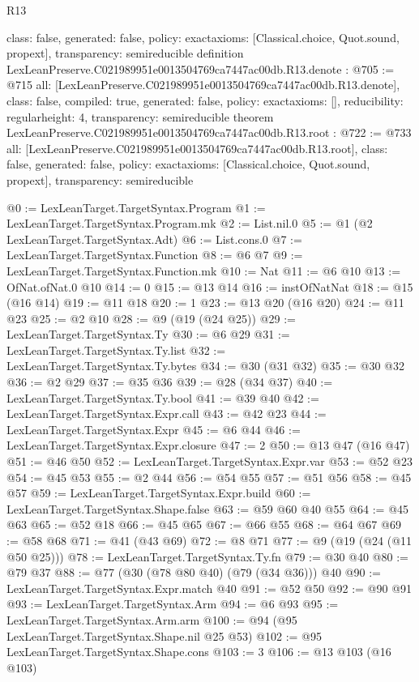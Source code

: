 \begin{lexlean}{R13}
\begin{coremodule}
{  class: false,
  generated: false,
  policy: exact{axioms: [Classical.choice, Quot.sound, propext]},
  transparency: semireducible
}
definition LexLeanPreserve.C021989951e0013504769ca7447ac00db.R13.denote : @705 := @715 {
  all: [LexLeanPreserve.C021989951e0013504769ca7447ac00db.R13.denote],
  class: false,
  compiled: true,
  generated: false,
  policy: exact{axioms: []},
  reducibility: regular{height: 4},
  transparency: semireducible
}
theorem LexLeanPreserve.C021989951e0013504769ca7447ac00db.R13.root : @722 := @733 {
  all: [LexLeanPreserve.C021989951e0013504769ca7447ac00db.R13.root],
  class: false,
  generated: false,
  policy: exact{axioms: [Classical.choice, Quot.sound, propext]},
  transparency: semireducible
}

@0 := LexLeanTarget.TargetSyntax.Program
@1 := LexLeanTarget.TargetSyntax.Program.mk
@2 := List.nil.{0}
@5 := @1 (@2 LexLeanTarget.TargetSyntax.Adt)
@6 := List.cons.{0}
@7 := LexLeanTarget.TargetSyntax.Function
@8 := @6 @7
@9 := LexLeanTarget.TargetSyntax.Function.mk
@10 := Nat
@11 := @6 @10
@13 := OfNat.ofNat.{0} @10
@14 := 0
@15 := @13 @14
@16 := instOfNatNat
@18 := @15 (@16 @14)
@19 := @11 @18
@20 := 1
@23 := @13 @20 (@16 @20)
@24 := @11 @23
@25 := @2 @10
@28 := @9 (@19 (@24 @25))
@29 := LexLeanTarget.TargetSyntax.Ty
@30 := @6 @29
@31 := LexLeanTarget.TargetSyntax.Ty.list
@32 := LexLeanTarget.TargetSyntax.Ty.bytes
@34 := @30 (@31 @32)
@35 := @30 @32
@36 := @2 @29
@37 := @35 @36
@39 := @28 (@34 @37)
@40 := LexLeanTarget.TargetSyntax.Ty.bool
@41 := @39 @40
@42 := LexLeanTarget.TargetSyntax.Expr.call
@43 := @42 @23
@44 := LexLeanTarget.TargetSyntax.Expr
@45 := @6 @44
@46 := LexLeanTarget.TargetSyntax.Expr.closure
@47 := 2
@50 := @13 @47 (@16 @47)
@51 := @46 @50
@52 := LexLeanTarget.TargetSyntax.Expr.var
@53 := @52 @23
@54 := @45 @53
@55 := @2 @44
@56 := @54 @55
@57 := @51 @56
@58 := @45 @57
@59 := LexLeanTarget.TargetSyntax.Expr.build
@60 := LexLeanTarget.TargetSyntax.Shape.false
@63 := @59 @60 @40 @55
@64 := @45 @63
@65 := @52 @18
@66 := @45 @65
@67 := @66 @55
@68 := @64 @67
@69 := @58 @68
@71 := @41 (@43 @69)
@72 := @8 @71
@77 := @9 (@19 (@24 (@11 @50 @25)))
@78 := LexLeanTarget.TargetSyntax.Ty.fn
@79 := @30 @40
@80 := @79 @37
@88 := @77 (@30 (@78 @80 @40) (@79 (@34 @36))) @40
@90 := LexLeanTarget.TargetSyntax.Expr.match @40
@91 := @52 @50
@92 := @90 @91
@93 := LexLeanTarget.TargetSyntax.Arm
@94 := @6 @93
@95 := LexLeanTarget.TargetSyntax.Arm.arm
@100 := @94 (@95 LexLeanTarget.TargetSyntax.Shape.nil @25 @53)
@102 := @95 LexLeanTarget.TargetSyntax.Shape.cons
@103 := 3
@106 := @13 @103 (@16 @103)

\end{coremodule}
\end{lexlean}
